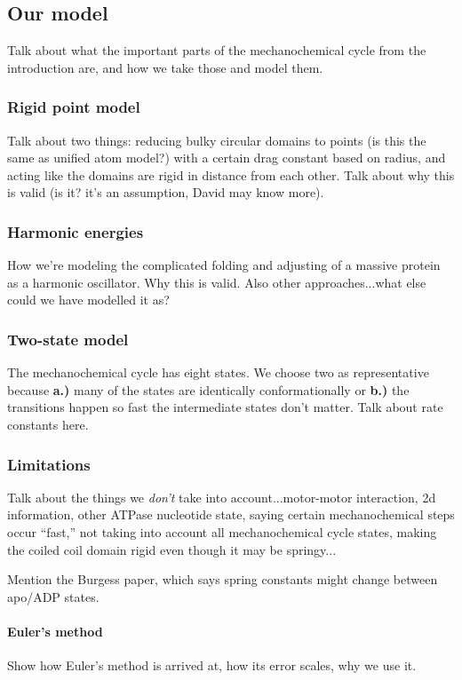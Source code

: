 \documentclass[10pt]{article} %
\begin{document}
\subsection{Our model}
Talk about what the important parts of the mechanochemical cycle from the introduction are, and how
we take those and model them.\\
\subsubsection{Rigid point model}
Talk about two things: reducing bulky circular domains to points (is this the same as unified atom
model?) with a certain drag constant based on radius, and acting like the domains are rigid in
distance from each other. Talk about why this is valid (is it? it's an assumption, David may know
more).
\subsubsection{Harmonic energies}
How we're modeling the complicated folding and adjusting of a massive protein as a harmonic
oscillator. Why this is valid. Also other approaches...what else could we have modelled it as?
\subsubsection{Two-state model}
The mechanochemical cycle has eight states. We choose two as representative because \textbf{a.)}
many of the states are identically conformationally or \textbf{b.)} the transitions happen so fast
the intermediate states don't matter. Talk about rate constants here.
\subsubsection{Limitations}
Talk about the things we \textit{don't} take into account...motor-motor interaction, 2d information,
other ATPase nucleotide state, saying certain mechanochemical steps occur ``fast,'' not taking into
account all mechanochemical cycle states, making the coiled coil domain rigid even though it may be
springy...

Mention the Burgess paper, which says spring constants might change between apo/ADP states.

\paragraph{Euler’s method}
Show how Euler's method is arrived at, how its error scales, why we use it.
\end{document}
